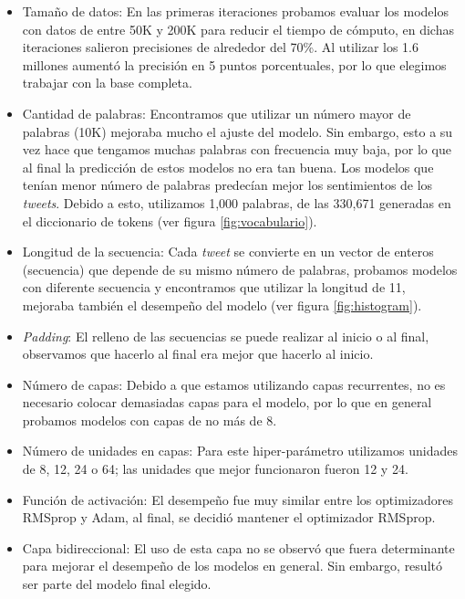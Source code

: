 \documentclass[sigconf, nonacm, spanish]{acmart}
\begin{document}
\begin{itemize}

\item Tamaño de datos: En las primeras iteraciones probamos evaluar los modelos con datos de entre 50K y 200K para reducir el tiempo de cómputo, en dichas iteraciones salieron precisiones de alrededor del 70\%. Al utilizar los 1.6 millones aumentó la precisión en 5 puntos porcentuales, por lo que elegimos trabajar con la base completa.

\item Cantidad de palabras: Encontramos que utilizar un número mayor de palabras (10K) mejoraba mucho el ajuste del modelo. Sin embargo, esto a su vez hace que tengamos muchas palabras con frecuencia muy baja, por lo que al final la predicción de estos modelos no era tan buena. Los modelos que tenían menor número de palabras predecían mejor los sentimientos de los \textit{tweets}. Debido a esto, utilizamos 1,000 palabras, de las 330,671 generadas en el diccionario de tokens (ver figura \ref{fig:vocabulario}). 

\item Longitud de la secuencia: Cada \textit{tweet} se convierte en un vector de enteros (secuencia) que depende de su mismo número de palabras, probamos modelos con diferente secuencia y encontramos que utilizar la longitud de 11, mejoraba también el desempeño del modelo (ver figura \ref{fig:histogram}). 

\item \textit{Padding}: El relleno de las secuencias se puede realizar al inicio o al final, observamos que hacerlo al final era mejor que hacerlo al inicio.

\item Número de capas: Debido a que estamos utilizando capas recurrentes, no es necesario colocar demasiadas capas para el modelo, por lo que en general probamos modelos con capas de no más de 8.

\item Número de unidades en capas: Para este hiper-parámetro utilizamos unidades de 8, 12, 24 o 64; las unidades que mejor funcionaron fueron 12 y 24. 

\item Función de activación: El desempeño fue muy similar entre los optimizadores RMSprop y Adam, al final, se decidió mantener el optimizador RMSprop.

\item Capa bidireccional: El uso de esta capa no se observó que fuera determinante para mejorar el desempeño de los modelos en general. Sin embargo, resultó ser parte del modelo final elegido.


\end{itemize}
\end{document}
